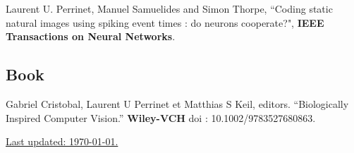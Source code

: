 \documentclass[11pt, a4paper]{article}
\newcommand{\doi}[1]{\href{#1}{\scriptsize\textsc{[doi]}}}
\newcommand{\years}[1]{\marginnote{\scriptsize #1}}
\providecommand{\doi}[1]{doi: #1}\else
\providecommand{\doi}{doi: \begingroup \urlstyle{rm}\Url}\fi
\begin{document}
\noindent\years{2004}Laurent U. Perrinet, Manuel Samuelides and Simon Thorpe, ``Coding static natural images using spiking event times : do neurons cooperate?",  {\bf IEEE Transactions on Neural Networks}.%

\subsection*{Book}
\noindent\years{2015}Gabriel Cristobal, Laurent U Perrinet et Matthias S Keil, editors. ``Biologically Inspired Computer Vision.'' {\bf Wiley-VCH} %
doi : 10.1002/9783527680863. %
%
%

\vfill{}
\hrulefill

\begin{center}

{\footnotesize \href{https://github.com/laurentperrinet/perrinet_curriculum-vitae.tex}{Last updated: \today .}
}
\end{center}
\end{document}

